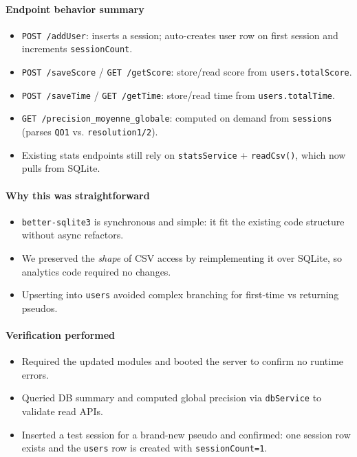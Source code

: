 \documentclass[11pt,a4paper]{article}
\begin{document}
\paragraph{Endpoint behavior summary}
\begin{itemize}[noitemsep]
  \item \texttt{POST /addUser}: inserts a session; auto-creates user row on first session and increments \texttt{sessionCount}.
  \item \texttt{POST /saveScore} / \texttt{GET /getScore}: store/read score from \texttt{users.totalScore}.
  \item \texttt{POST /saveTime} / \texttt{GET /getTime}: store/read time from \texttt{users.totalTime}.
  \item \texttt{GET /precision\_moyenne\_globale}: computed on demand from \texttt{sessions} (parses \texttt{QO1} vs. \texttt{resolution1/2}).
  \item Existing stats endpoints still rely on \texttt{statsService} + \texttt{readCsv()}, which now pulls from SQLite.
\end{itemize}

\paragraph{Why this was straightforward}
\begin{itemize}[noitemsep]
  \item \texttt{better-sqlite3} is synchronous and simple: it fit the existing code structure without async refactors.
  \item We preserved the \textit{shape} of CSV access by reimplementing it over SQLite, so analytics code required no changes.
  \item Upserting into \texttt{users} avoided complex branching for first-time vs returning pseudos.
\end{itemize}

\paragraph{Verification performed}
\begin{itemize}[noitemsep]
  \item Required the updated modules and booted the server to confirm no runtime errors.
  \item Queried DB summary and computed global precision via \texttt{dbService} to validate read APIs.
  \item Inserted a test session for a brand-new pseudo and confirmed: one session row exists and the \texttt{users} row is created with \texttt{sessionCount=1}.
\end{itemize}
\end{document}
